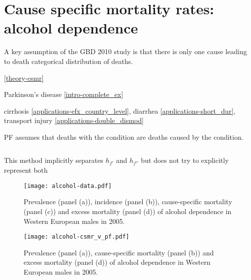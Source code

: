 \chapter{Cause specific mortality rates: alcohol dependence}
\label{applications-csmr}

A key assumption of the GBD 2010 study is that there is only one cause leading to death categorical distribution of deaths.


\ref{theory-csmr}

Parkinson's disease \ref{intro-complete_ex}

cirrhosis \ref{applications-efx_country_level}, diarrhea \ref{applications-short_dur}, transport injury \ref{applications-double_dismod}

PF assumes that deaths with the condition are deaths caused by the condition.

\begin{equation}
    
\end{equation}

This method implicitly separates $h_{f'}$ and $h_{f''}$ but does not try to explicitly represent both

    \begin{figure}[h]
        \begin{center}
            \texttt{[image: alcohol-data.pdf]}
            \caption{Prevalence (panel (a)), incidence (panel (b)), cause-specific mortality (panel (c)) and excess mortality (panel (d)) of alcohol dependence in Western European males in 2005.}
            \label{fig:app-alcohol data}
        \end{center}
    \end{figure} 
    
    \begin{figure}[h]
        \begin{center}
            \texttt{[image: alcohol-csmr\_v\_pf.pdf]}
            \caption{Prevalence (panel (a)), cause-specific mortality (panel (b)) and excess mortality (panel (d)) of alcohol dependence in Western European males in 2005.}
            \label{fig:app-alcohol compare}
        \end{center}
    \end{figure} 